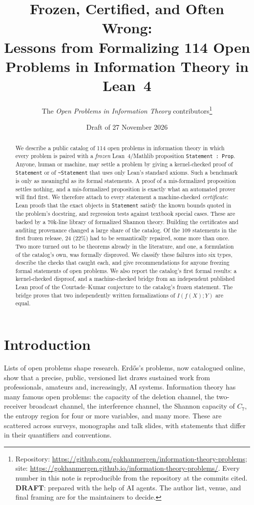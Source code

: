 \documentclass[11pt]{article}
\title{Frozen, Certified, and Often Wrong:\\
Lessons from Formalizing 114 Open Problems in Information Theory in Lean~4}
\author{The \emph{Open Problems in Information Theory} contributors\thanks{%
Repository: \url{https://github.com/gokhanmergen/information-theory-problems}; site:
\url{https://gokhanmergen.github.io/information-theory-problems/}. Every number in this note is
reproducible from the repository at the commits cited. \textbf{DRAFT}: prepared with the help of AI
agents. The author list, venue, and final framing are for the maintainers to decide.}}
\date{Draft of 27 November 2026}
\newcommand{\code}[1]{\texttt{#1}}
\begin{document}
\maketitle

\begin{abstract}
We describe a public catalog of 114 open problems in information theory in which every
problem is paired with a \emph{frozen} Lean~4/Mathlib proposition \code{Statement : Prop}.
Anyone, human or machine, may settle a problem by giving a kernel-checked proof of
\code{Statement} or of \code{\textasciitilde Statement} that uses only Lean's standard axioms.
Such a benchmark is only as meaningful as its formal statements. A proof of a mis-formalized
proposition settles nothing, and a mis-formalized proposition is exactly what an automated prover
will find first.
We therefore attach to every statement a machine-checked \emph{certificate}: Lean proofs that the
exact objects in \code{Statement} satisfy the known bounds quoted in the problem's docstring, and
regression tests against textbook special cases. These are backed by a 70k-line library of
formalized Shannon theory.
Building the certificates and auditing provenance changed a large share of the catalog.
Of the 109 statements in the first frozen release, 24 (22\%) had to be semantically repaired, some
more than once. Two more turned out to be theorems already in the literature, and one, a
formulation of the catalog's own, was formally disproved. We classify these failures into six
types, describe the checks that caught each, and give recommendations for anyone freezing formal
statements of open problems.
We also report the catalog's first formal results: a kernel-checked disproof, and a
machine-checked bridge from an independent published Lean proof of the Courtade--Kumar conjecture
to the catalog's frozen statement. The bridge proves that two independently written formalizations
of $I(f(X);Y)$ are equal.
\end{abstract}

\section{Introduction}

Lists of open problems shape research. Erd\H{o}s's problems, now catalogued online, show that a
precise, public, versioned list draws sustained work from professionals, amateurs and,
increasingly, AI systems. Information theory has many famous open problems: the capacity of the
deletion channel, the two-receiver broadcast channel, the interference channel, the Shannon
capacity of $C_7$, the entropy region for four or more variables, and many more. These are
scattered across surveys, monographs and talk slides, with statements that differ in their
quantifiers and conventions.
\end{document}
